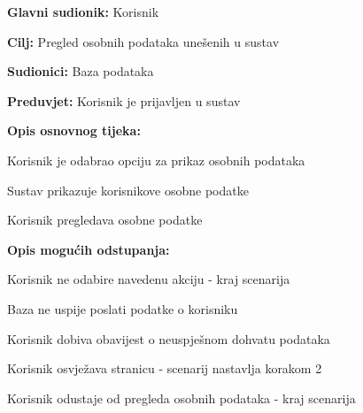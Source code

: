					\noindent {}
					\begin{packed_item}
	
						\item \textbf{Glavni sudionik: }Korisnik
						\item  \textbf{Cilj:} Pregled osobnih podataka unešenih u sustav
						\item  \textbf{Sudionici:} Baza podataka
						\item  \textbf{Preduvjet:} Korisnik je prijavljen u sustav
						\item  \textbf{Opis osnovnog tijeka:}
						
						\item[] \begin{packed_enum}
							\item Korisnik je odabrao opciju za prikaz osobnih podataka
							\item Sustav prikazuje korisnikove osobne podatke 
							\item Korisnik pregledava osobne podatke
						\end{packed_enum}
						\item  \textbf{Opis mogućih odstupanja:}

						\item[] \begin{packed_item}
							\item[1.a] Korisnik ne odabire navedenu akciju - kraj scenarija
							\item[2.a] Baza ne uspije poslati podatke o korisniku
							\item[] \begin{packed_enum}			
								\item Korisnik dobiva obavijest o neuspješnom dohvatu podataka
								\item
									\begin{packed_enum}
										\item Korisnik osvježava stranicu - scenarij nastavlja korakom 2
										\item Korisnik odustaje od pregleda osobnih podataka - kraj scenarija
									\end{packed_enum}						
							\end{packed_enum}	
						\end{packed_item}	
					\end{packed_item}

